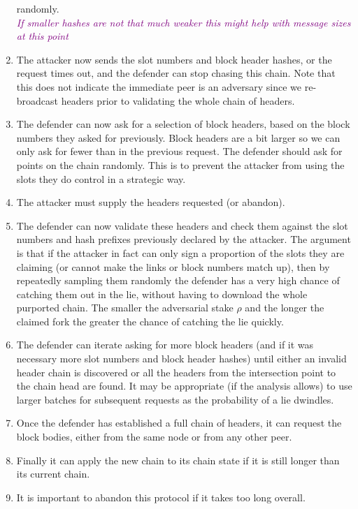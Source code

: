 \documentclass{article}
\newcommand{\njd}[1]{\textcolor{purple}{\emph{#1}}}
\theoremstyle{definition}{
  \newtheorem{lemma}{Lemma}[section] %
  \newtheorem{definition}[lemma]{Definition}
}
\theoremstyle{theorem}{
  \newtheorem{invariant}[lemma]{Invariant}
  \newtheorem{proofobligation}[lemma]{Proof Obligation}
}
\numberwithin{equation}{lemma}
\begin{document}
\begin{enumerate}
      randomly. \\ \njd{If smaller hashes are not that much weaker this might help with message sizes at this point}
\item The attacker now sends the slot numbers and block header hashes, or the
      request times out, and the defender can stop chasing this chain. Note
      that this does not indicate the immediate peer is an adversary since we
      re-broadcast headers prior to validating the whole chain of headers.
\item The defender can now ask for a selection of block headers, based on the
      block numbers they asked for previously. Block headers are a bit larger
      so we can only ask for fewer than in the previous request. The defender
      should ask for points on the chain randomly. This is to prevent the
      attacker from using the slots they do control in a strategic way.
\item The attacker must supply the headers requested (or abandon).
\item The defender can now validate these headers and check them against the
      slot numbers and hash prefixes previously declared by the attacker. The
      argument is that if the attacker in fact can only sign a proportion of
      the slots they are claiming (or cannot make the links or block numbers
      match up), then by repeatedly sampling them randomly the defender has
      a very high chance of catching them out in the lie, without having to
      download the whole purported chain. The smaller the adversarial stake
      $\rho$ and the longer the claimed fork the greater the chance of catching
      the lie quickly.
\item The defender can iterate asking for more block headers (and if it was
      necessary more slot numbers and block header hashes) until either an
      invalid header chain is discovered or all the headers from the
      intersection point to the chain head are found. It may be appropriate
      (if the analysis allows) to use larger batches for subsequent requests
      as the probability of a lie dwindles.
\item Once the defender has established a full chain of headers, it can request
      the block bodies, either from the same node or from any other peer.
\item Finally it can apply the new chain to its chain state if it is still
      longer than its current chain.
\item It is important to abandon this protocol if it takes too long overall.

\end{enumerate}
\end{document}
